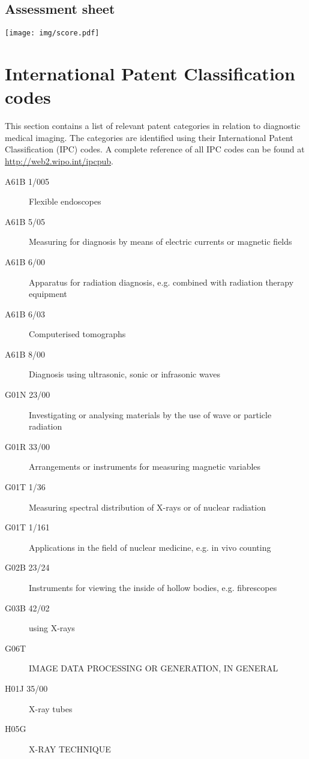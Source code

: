 \begin{landscape}
	\appendix
	\chapter{Assessment sheet}\label{app:score}
	  \texttt{[image: img/score.pdf]}
\end{landscape}

\chapter{International Patent Classification codes}
This section contains a list of relevant patent categories in relation to
diagnostic medical imaging. The categories are identified using their
International Patent Classification (IPC) codes. A complete reference of all IPC
codes can be found at \url{http://web2.wipo.int/ipcpub}.

\begin{description}
  \item[A61B 1/005] Flexible endoscopes
  \item[A61B 5/05] Measuring for diagnosis by means of electric currents or magnetic fields
  \item[A61B 6/00] Apparatus for radiation diagnosis, e.g. combined with radiation therapy equipment
  \item[A61B 6/03] Computerised tomographs
  \item[A61B 8/00] Diagnosis using ultrasonic, sonic or infrasonic waves
  \item[G01N 23/00] Investigating or analysing materials by the use of wave or particle radiation
  \item[G01R 33/00] Arrangements or instruments for measuring magnetic variables
  \item[G01T 1/36] Measuring spectral distribution of X-rays or of nuclear radiation
  \item[G01T 1/161] Applications in the field of nuclear medicine, e.g. in vivo counting
  \item[G02B 23/24] Instruments for viewing the inside of hollow bodies, e.g. fibrescopes
  \item[G03B 42/02] using X-rays
  \item[G06T] IMAGE DATA PROCESSING OR GENERATION, IN GENERAL 
  \item[H01J 35/00] X-ray tubes
  \item[H05G] X-RAY TECHNIQUE
\end{description}